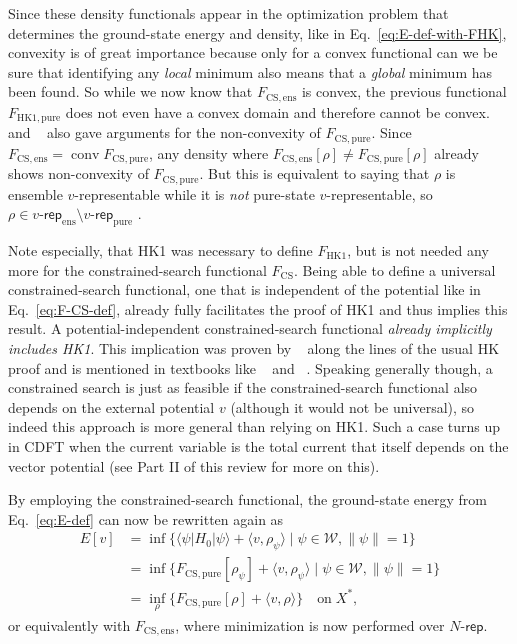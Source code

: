 \documentclass[journal=apcach,manuscript=article,layout=twocolumn]{achemso}
\newcommand{\psispace}{\mathcal{W}}
\newcommand{\FHK}{F_\mathrm{HK1}}
\newcommand{\FHKpure}{F_\mathrm{HK1,pure}}
\newcommand{\FCS}{F_\mathrm{CS}}
\newcommand{\FCSpure}{F_\mathrm{CS,pure}}
\newcommand{\FCSens}{F_\mathrm{CS,ens}}
\newcommand{\vrep}{\ensuremath{v\text{-}\mathsf{rep}}}
\newcommand{\vreppure}{\ensuremath{\vrep_\mathrm{pure}}}
\newcommand{\vrepens}{\ensuremath{\vrep_\mathrm{ens}}}
\newcommand{\Nrep}{\ensuremath{N\text{-}\mathsf{rep}}}
\DeclareMathOperator{\conv}{conv}
\begin{document}
Since these density functionals appear in the optimization problem that determines the ground-state energy and density, like in Eq.~\eqref{eq:E-def-with-FHK}, convexity is of great importance because only for a convex functional can we be sure that identifying any \emph{local} minimum also means that a \emph{global} minimum has been found. So while we now know that $\FCSens$ is convex, the previous functional $\FHKpure$ does not even have a convex domain and therefore cannot be convex.
\citeauthor{levy1982}~\cite{levy1982} and \citeauthor{Lieb1983}~\cite{Lieb1983} also gave arguments for the non-convexity of $\FCSpure$. Since $\FCSens = \conv \FCSpure$, any density where $\FCSens[\rho] \neq \FCSpure[\rho]$ already shows non-convexity of $\FCSpure$. But this is equivalent to saying that $\rho$ is ensemble $v$-representable while it is \emph{not} pure-state $v$-representable, so $\rho\in\vrepens\setminus\vreppure$ \cite[Proposition~21]{penz-DFT-graphs}.

Note especially, that HK1 was necessary to define $\FHK$, but is not needed any more for the constrained-search functional $\FCS$. Being able to define a universal constrained-search functional, one that is independent of the potential like in Eq.~\eqref{eq:F-CS-def}, already fully facilitates the proof of HK1 and thus implies this result. A potential-independent constrained-search functional \emph{already implicitly includes HK1}. This implication was proven by \citeauthor{Levy79}~\cite{Levy79} along the lines of the usual HK proof and is mentioned in textbooks like \citeauthor{parr}~\cite[after their Eq.~(3.4.4)]{parr} and \citeauthor{tsuneda}~\cite[after Eq.~(4.5)]{tsuneda}. Speaking generally though, a constrained search is just as feasible if the constrained-search functional also depends on the external potential $v$ (although it would not be universal), so indeed this approach is more general than relying on HK1. Such a case turns up in CDFT when the current variable is the total current that itself depends on the vector potential (see Part II of this review for more on this).

By employing the constrained-search functional, the ground-state energy from Eq.~\eqref{eq:E-def} can now be rewritten again as
\begin{equation*}%
\begin{aligned}
E[v] &= \inf\{ \langle \psi | H_0 |\psi \rangle + \langle v,\rho_\psi \rangle \mid \psi \in \psispace, \|\psi\|=1 \} \\
&= \inf\{ \FCSpure[\rho_\psi] + \langle v,\rho_\psi \rangle \mid \psi \in \psispace, \|\psi\|=1 \} \\
&= \inf_\rho \{ \FCSpure[\rho] + \langle v,\rho \rangle \} \quad\text{on}\; X^*,
\end{aligned}
\end{equation*}
or equivalently with $\FCSens$, where minimization is now performed over $\Nrep$.
\end{document}
